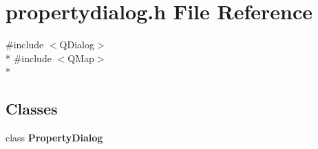 \section{propertydialog.\+h File Reference}
\label{bk3_2properties_2propertydialog_8h}
{\ttfamily \#include $<$Q\+Dialog$>$}\\*
{\ttfamily \#include $<$Q\+Map$>$}\\*
\subsection*{Classes}
\begin{DoxyCompactItemize}
\item 
class {\bf Property\+Dialog}
\end{DoxyCompactItemize}
